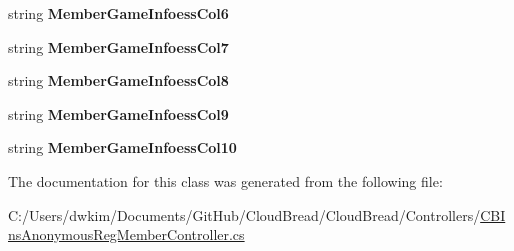 \begin{DoxyCompactItemize}
\item 
string {\bfseries Member\+Game\+Infoess\+Col6}\hypertarget{a00115_abb09de1c381ffff237b9a50dd34c784a}{}\label{a00115_abb09de1c381ffff237b9a50dd34c784a}

\item 
string {\bfseries Member\+Game\+Infoess\+Col7}\hypertarget{a00115_a797e2f43b342c2cd8a3e4058dbed1ba8}{}\label{a00115_a797e2f43b342c2cd8a3e4058dbed1ba8}

\item 
string {\bfseries Member\+Game\+Infoess\+Col8}\hypertarget{a00115_a6d5dae47b633eef5a38bb348c8c91cb6}{}\label{a00115_a6d5dae47b633eef5a38bb348c8c91cb6}

\item 
string {\bfseries Member\+Game\+Infoess\+Col9}\hypertarget{a00115_ad9e9212afd2bc7d243584b79f80b4bd9}{}\label{a00115_ad9e9212afd2bc7d243584b79f80b4bd9}

\item 
string {\bfseries Member\+Game\+Infoess\+Col10}\hypertarget{a00115_a0fba3e170df012a1d4ab0ded4cf19e44}{}\label{a00115_a0fba3e170df012a1d4ab0ded4cf19e44}

\end{DoxyCompactItemize}


The documentation for this class was generated from the following file\+:\begin{DoxyCompactItemize}
\item 
C\+:/\+Users/dwkim/\+Documents/\+Git\+Hub/\+Cloud\+Bread/\+Cloud\+Bread/\+Controllers/\hyperlink{a00214}{C\+B\+Ins\+Anonymous\+Reg\+Member\+Controller.\+cs}\end{DoxyCompactItemize}

